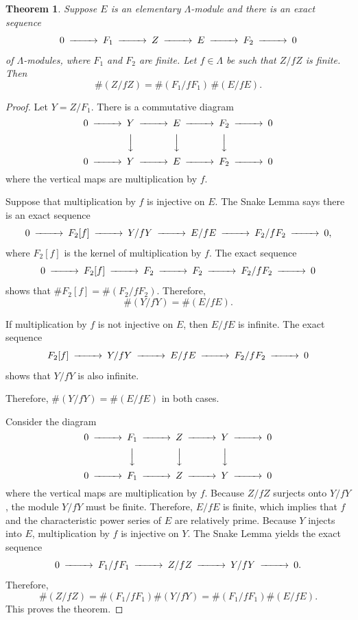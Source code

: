 \documentclass{amsart}
\newtheorem{theorem}{Theorem}
\begin{document}
\begin{theorem}\label{PropOrd}
Suppose $E$ is an elementary $\Lambda$-module and there is an exact sequence
$$
\begin{CD}
0@>>> F_1  @>>> Z @>>> E @>>> F_2 @>>>0
\end{CD}
$$
of $\Lambda$-modules, where $F_1$ and $F_2$ are finite. Let $f\in \Lambda$ be such that $Z/fZ$ is finite. Then
$$
\#(Z/fZ) = \#(F_1/fF_1)\, \#(E/fE).
$$
\end{theorem}
\begin{proof} Let $Y=Z/F_1$.
There is a commutative diagram
$$
\begin{CD}
0@>>> Y @>>> E @>>> F_2 @>>> 0\\
 @.@VVV @VVV@VVV @.\\
0@>>> Y @>>> E @>>> F_2 @>>> 0\\
\end{CD}
$$
where the vertical maps are multiplication by $f$.

Suppose that multiplication by $f$ is injective on $E$. The Snake Lemma says there is an exact sequence
$$
\begin{CD}
0@>>> F_2[f] @>>> Y/f Y @>>> E/f E @>>> F_2/f F_2 @>>>0,
\end{CD}
$$
where $F_2[f]$ is the kernel of multiplication by $f$.
The exact sequence 
$$
\begin{CD}
0@>>> F_2[f]@>>> F_2@>>>F_2@>>>F_2/fF_2 @>>>0
\end{CD}
$$
shows that $\#F_2[f] = \#(F_2/fF_2)$. Therefore,
$$
\#(Y/f Y) = \#(E/f E).
$$

If multiplication by $f$ is not injective on $E$, then $E/f E$ is infinite.
The exact sequence
$$
\begin{CD}
 F_2[f] @>>> Y/f Y @>>> E/f E @>>> F_2/f F_2 @>>>0
\end{CD}
$$
shows that $Y/f Y$ is also infinite. 

Therefore, $\#(Y/fY) = \#(E/fE)$ in both cases.

Consider the diagram
$$
\begin{CD}
0@>>> F_1 @>>> Z @>>> Y @>>> 0\\
 @.@VVV @VVV@VVV @.\\
0@>>> F_1 @>>> Z @>>> Y @>>> 0\\
\end{CD}
$$
where the vertical maps are multiplication by $f$.
Because $Z/fZ$ surjects onto $Y/fY$, the module $Y/fY$
must be finite. Therefore, $E/fE$ is finite, which implies that
$f$ and the characteristic power series of $E$ are relatively prime. 
Because $Y$ injects into $E$, multiplication by $f$ is injective 
on $Y$. The Snake Lemma yields the exact sequence
$$
\begin{CD}
0@>>> F_1/fF_1  @>>> Z/fZ @>>> Y/fY @>>>0.
\end{CD}
$$
Therefore,
$$
\#(Z/fZ) = \#(F_1/fF_1) \#(Y/fY)= \#(F_1/fF_1) \#(E/fE).
$$
This proves the theorem. \end{proof}
\end{document}
